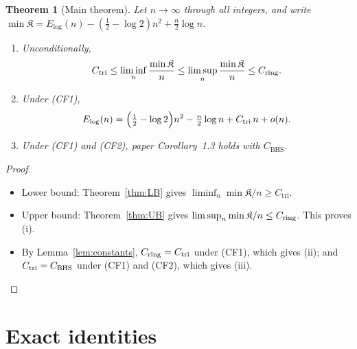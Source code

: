 \documentclass[11pt]{article}
\newtheorem{theorem}{Theorem}[section]
\theoremstyle{definition}
\theoremstyle{remark}
\begin{document}
\begin{theorem}[Main theorem]\label{thm:main}
Let $n\to\infty$ through all integers, and write $\min\mathfrak K=E_{\log}(n)-(\tfrac12-\log2)n^2+\tfrac n2\log n$.
\begin{enumerate}[label=(\roman*)]
\item \emph{Unconditionally,}
  \[
  C_{\mathrm{tri}}\le\liminf_n\frac{\min\mathfrak K}{n}\le\limsup_n\frac{\min\mathfrak K}{n}\le C_{\rm ring}.
  \]
\item \emph{Under (CF1),}
  \[
  E_{\log}(n)=\Bigl(\tfrac12-\log2\Bigr)n^2-\tfrac n2\log n+C_{\mathrm{tri}}\,n+o(n).
  \]
\item \emph{Under (CF1) and (CF2),} paper Corollary~1.3 holds with $C_{\mathrm{BHS}}$.
\end{enumerate}
\end{theorem}
\begin{proof}
\begin{itemize}[leftmargin=*]
\item Lower bound: Theorem~\ref{thm:LB} gives
  $\liminf_n\min\mathfrak K/n\ge C_{\mathrm{tri}}$.
\item Upper bound: Theorem~\ref{thm:UB} gives
  $\limsup_n\min\mathfrak K/n\le C_{\rm ring}$. This proves (i).
\item By Lemma~\ref{lem:constants}, $C_{\rm ring}=C_{\mathrm{tri}}$ under (CF1), which gives (ii);
  and $C_{\mathrm{tri}}=C_{\rm BHS}$ under (CF1) and (CF2), which gives (iii).\qedhere
\end{itemize}
\end{proof}

\section{Exact identities}\label{sec:identities}
\end{document}
